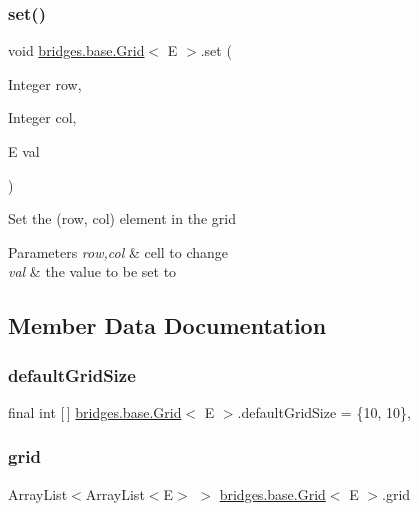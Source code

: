 \subsubsection{\texorpdfstring{set()}{set()}}
{\footnotesize\ttfamily void \mbox{\hyperlink{classbridges_1_1base_1_1_grid}{bridges.\+base.\+Grid}}$<$ E $>$.set (\begin{DoxyParamCaption}\item[{Integer}]{row,  }\item[{Integer}]{col,  }\item[{E}]{val }\end{DoxyParamCaption})}

Set the (row, col) element in the grid 
\begin{DoxyParams}{Parameters}
{\em row,col} & cell to change \\
\hline
{\em val} & the value to be set to \\
\hline
\end{DoxyParams}


\subsection{Member Data Documentation}
\mbox{\label{classbridges_1_1base_1_1_grid_a45c2786d2af83624202192857a27724f}} 
\subsubsection{\texorpdfstring{defaultGridSize}{defaultGridSize}}
{\footnotesize\ttfamily final int \mbox{[}$\,$\mbox{]} \mbox{\hyperlink{classbridges_1_1base_1_1_grid}{bridges.\+base.\+Grid}}$<$ E $>$.default\+Grid\+Size = \{10, 10\}\hspace{0.3cm}{\ttfamily [static]}, {\ttfamily [protected]}}

\mbox{\label{classbridges_1_1base_1_1_grid_ad1f3f6968d58188425bd992c05c655a6}} 
\subsubsection{\texorpdfstring{grid}{grid}}
{\footnotesize\ttfamily Array\+List$<$Array\+List$<$E$>$ $>$ \mbox{\hyperlink{classbridges_1_1base_1_1_grid}{bridges.\+base.\+Grid}}$<$ E $>$.grid\hspace{0.3cm}{\ttfamily [protected]}}

